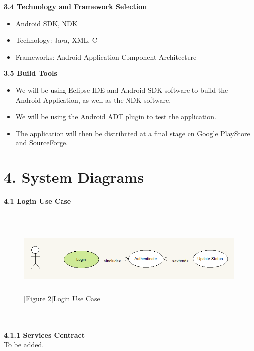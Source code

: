 \documentclass[29pt,a4paper]{moderncv}
\begin{document}
		\vspace{5mm}
\newpage		
		\noindent \textbf{3.4 Technology and Framework Selection}
			\begin{itemize}
				\item Android SDK, NDK
				\item Technology: Java, XML, C
				\item Frameworks: Android Application Component Architecture
			\end{itemize}
		\vspace{5mm}
		
		\noindent \textbf{3.5 Build Tools}
			\begin{itemize}
				\item We will be using Eclipse IDE and Android SDK software to build the Android Application, as well as the NDK software.
				\item We will be using the Android ADT plugin to test the application. 
				\item The application will then be distributed at a final stage on Google PlayStore and SourceForge.
				
			\end{itemize}
		\vspace{5mm}
	\vspace{5mm}	
\newpage
	\section*{\textbf{4. System Diagrams}}
	\vspace{2mm}
	 \left\textbf{4.1 Login Use Case}\\
		\\ \begin{figure}
			\centering
			\\ \includegraphics[width=5.8in, height=1.1in]{./loginCase.png}
			\\\caption{[Figure 2]Login Use Case}
		\end{figure}\\
	
		\\ \noindent\textbf{4.1.1 Services Contract}\\
		To be added.\\
		
\end{document}
